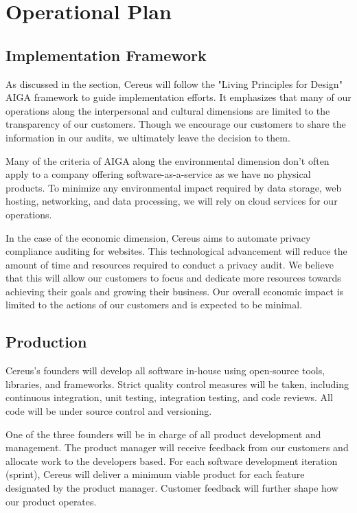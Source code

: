 {\let\cleardoublepage\relax \chapter*{Operational Plan}}

\section{Implementation Framework}

As discussed in the  section, Cereus will follow the "Living Principles for Design" AIGA framework \cite{brink.aiga.2020} to guide implementation efforts. It emphasizes that many of our operations along the interpersonal and cultural dimensions are limited to the transparency of our customers. Though we encourage our customers to share the information in our audits, we ultimately leave the decision to them.

Many of the criteria of AIGA along the environmental dimension don't often apply to a company offering software-as-a-service as we have no physical products. To minimize any environmental impact required by data storage, web hosting, networking, and data processing, we will rely on cloud services for our operations.

In the case of the economic dimension, Cereus aims to automate privacy compliance auditing for websites. This technological advancement will reduce the amount of time and resources required to conduct a privacy audit. We believe that this will allow our customers to focus and dedicate more resources towards achieving their goals and growing their business. Our overall economic impact is limited to the actions of our customers and is expected to be minimal.

\section{Production}

Cereus's founders will develop all software in-house using open-source tools, libraries, and frameworks. Strict quality control measures will be taken, including continuous integration, unit testing, integration testing, and code reviews. All code will be under source control and versioning.

One of the three founders will be in charge of all product development and management. The product manager will receive feedback from our customers and allocate work to the developers based. For each software development iteration (sprint), Cereus will deliver a minimum viable product for each feature designated by the product manager. Customer feedback will further shape how our product operates.

